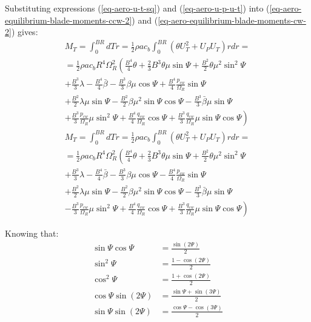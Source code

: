 Substituting expressions (\ref{eq-aero-u-t-sq}) and (\ref{eq-aero-u-p-u-t}) into (\ref{eq-aero-equilibrium-blade-moments-ccw-2}) and (\ref{eq-aero-equilibrium-blade-moments-cw-2}) gives:
\begin{multline}
  \label{eq-aero-blade-moment-thrust-ccw}
  M_T =
  \int_{0}^{BR} dT r =
  \frac{1}{2} \rho a c_b
  \int_{0}^{BR} \left( \theta U_T^2 + U_P U_T \right) r dr = \\
  =
  \frac{1}{2} \rho a c_b R^4 \Omega_R^2
  \left(
    \frac{B^4}{4} \theta
  + \frac{2}{3} B^3 \theta \mu \sin \Psi
  + \frac{B^2}{2} \theta \mu^2 \sin^2 \Psi
  \right.
  \\
  + \frac{B^3}{3} \lambda
  - \frac{B^4}{4} \bar \beta
  - \frac{B^3}{3} \beta \mu \cos \Psi
  + \frac{B^4}{4} \frac{p_{cw}}{\Omega_R} \sin \Psi \\
  + \frac{B^2}{2} \lambda \mu \sin \Psi
  - \frac{B^2}{2} \beta \mu^2 \sin \Psi \cos \Psi
  - \frac{B^3}{3} \bar \beta \mu \sin \Psi
  \\
  \left.
  + \frac{B^3}{3} \frac{p_{cw}}{\Omega_R} \mu \sin^2 \Psi
  + \frac{B^4}{4} \frac{q_{cw}}{\Omega_R} \cos \Psi
  + \frac{B^3}{3} \frac{q_{cw}}{\Omega_R} \mu \sin \Psi \cos \Psi
  \right)
\end{multline}
\begin{multline}
  \label{eq-aero-blade-moment-thrust-cw}
  M_T =
  \int_{0}^{BR} dT r =
  \frac{1}{2} \rho a c_b
  \int_{0}^{BR} \left( \theta U_T^2 + U_P U_T \right) r dr = \\
  =
  \frac{1}{2} \rho a c_b R^4 \Omega_R^2
  \left(
    \frac{B^4}{4} \theta
  + \frac{2}{3} B^3 \theta \mu \sin \Psi
  + \frac{B^2}{2} \theta \mu^2 \sin^2 \Psi
  \right.
  \\
  + \frac{B^3}{3} \lambda
  - \frac{B^4}{4} \bar \beta
  - \frac{B^3}{3} \beta \mu \cos \Psi
  - \frac{B^4}{4} \frac{p_{cw}}{\Omega_R} \sin \Psi \\
  + \frac{B^2}{2} \lambda \mu \sin \Psi
  - \frac{B^2}{2} \beta \mu^2 \sin \Psi \cos \Psi
  - \frac{B^3}{3} \bar \beta \mu \sin \Psi
  \\
  \left.
  - \frac{B^3}{3} \frac{p_{cw}}{\Omega_R} \mu \sin^2 \Psi
  + \frac{B^4}{4} \frac{q_{cw}}{\Omega_R} \cos \Psi
  + \frac{B^3}{3} \frac{q_{cw}}{\Omega_R} \mu \sin \Psi \cos \Psi
  \right)
\end{multline}

Knowing that:
\begin{align}
  \label{eq-aero-trigonometric-4}
  \sin \Psi \cos \Psi &= \frac{ \sin \left( 2 \Psi \right) }{2} \\
  \label{eq-aero-trigonometric-5}
  \sin^2 \Psi &= \frac{ 1 - \cos \left( 2 \Psi \right) }{2} \\
  \label{eq-aero-trigonometric-6}
  \cos^2 \Psi &= \frac{ 1 + \cos \left( 2 \Psi \right) }{2} \\
  \label{eq-aero-trigonometric-7}
  \cos \Psi \sin \left( 2 \Psi \right) &=
  \frac{ \sin \Psi + \sin \left( 3 \Psi \right) }{2} \\
  \label{eq-aero-trigonometric-8}
  \sin \Psi \sin \left( 2 \Psi \right) &=
  \frac{ \cos \Psi - \cos \left( 3 \Psi \right) }{2}
\end{align}

